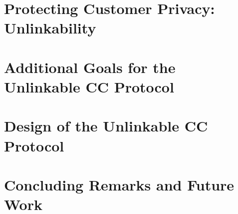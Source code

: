 \documentclass[12pt]{report}
\begin{document}
\chapter{Protecting Customer Privacy: Unlinkability}
\label{cha:unlinkability}


\chapter{Additional Goals for the Unlinkable CC Protocol}
\label{cha:unlinkable_goals}






\chapter{Design of the Unlinkable CC Protocol}
\label{cha:unlinkable_design}






\chapter{Concluding Remarks and Future Work}
\label{cha:conclusion}




\printindex

\begin{vita}

\end{vita}
\end{document}
